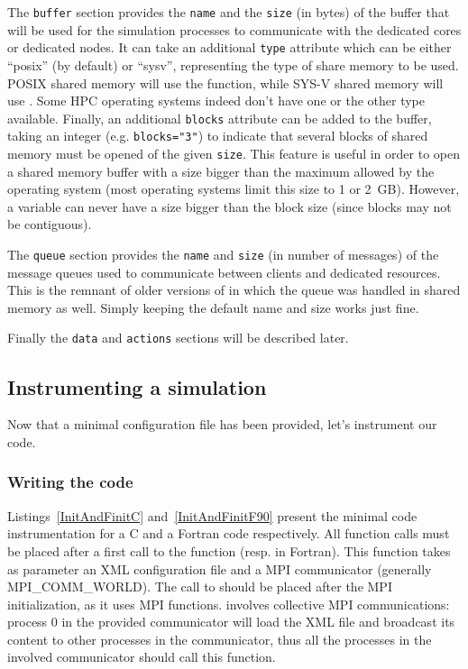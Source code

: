 The \texttt{buffer} section provides the \texttt{name} and the \texttt{size} (in bytes) of 
the buffer that will be used for the simulation processes to communicate with the dedicated cores
or dedicated nodes. It can take an additional \texttt{type} attribute which can be either ``posix'' 
(by default) or ``sysv'', representing the type of share memory to be used.
POSIX shared memory will use the  function, while SYS-V shared memory will
use . Some HPC operating systems indeed don't have one or the other type available.
Finally, an additional \texttt{blocks} attribute can be added to the buffer, 
taking an integer (e.g. \texttt{blocks="3"}) to indicate that several blocks of shared memory 
must be opened of the given \texttt{size}. This feature is useful in order to open a shared memory buffer 
with a size bigger than the maximum allowed by the operating system 
(most operating systems limit this size to 1 or 2~GB).
However, a variable can never have a size bigger than the block size 
(since blocks may not be contiguous).

The \texttt{queue} section provides the \texttt{name} and \texttt{size} 
(in number of messages) of the message queues
used to communicate between clients and dedicated resources. This is the remnant of
older versions of \Damaris{} in which the queue was handled in shared memory as well.
Simply keeping the default name and size works just fine.

Finally the \texttt{data} and \texttt{actions} sections will be described later.

\subsection{Instrumenting a simulation}

Now that a minimal configuration file has been provided, let's instrument our code.

\subsubsection{Writing the code}

Listings~\ref{InitAndFinitC} and~\ref{InitAndFinitF90} present the minimal code instrumentation
for a C and a Fortran code respectively. All \Damaris{} function calls must be placed after a first call to the
 function (resp.  in Fortran). This function
takes as parameter an XML configuration file 
and a MPI communicator (generally MPI\_COMM\_WORLD).
The call to  should be placed after the MPI initialization, as it uses
MPI functions.  involves collective MPI communications: process 0 in
the provided communicator will load the XML file and broadcast its content to other processes
in the communicator, thus all the processes in the involved communicator should call this function.

